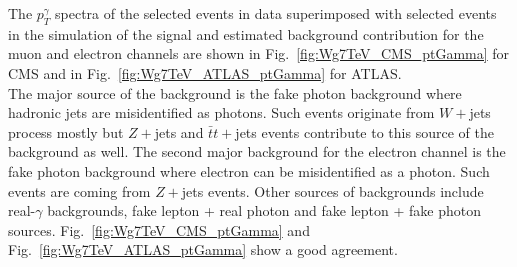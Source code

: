 








The $p_T^\gamma$ spectra of the selected events in data superimposed with selected events in the simulation of the signal and estimated background contribution for the muon and electron channels are shown in Fig.~\ref{fig:Wg7TeV_CMS_ptGamma} for CMS and in Fig.~\ref{fig:Wg7TeV_ATLAS_ptGamma} for ATLAS. \\

The major source of the background is the fake photon background where hadronic jets are misidentified as photons. Such events originate from $W+$jets process mostly but $Z+$jets and $\bar{t}t+$jets events contribute to this source of the background as well. The second major background for the electron channel is the fake photon background where electron can be misidentified as a photon.  Such events are coming from $Z+$jets events. Other sources of backgrounds include real-$\gamma$ backgrounds, fake lepton + real photon and fake lepton + fake photon sources. Fig.~\ref{fig:Wg7TeV_CMS_ptGamma} and Fig.~\ref{fig:Wg7TeV_ATLAS_ptGamma} show a good agreement.\\

